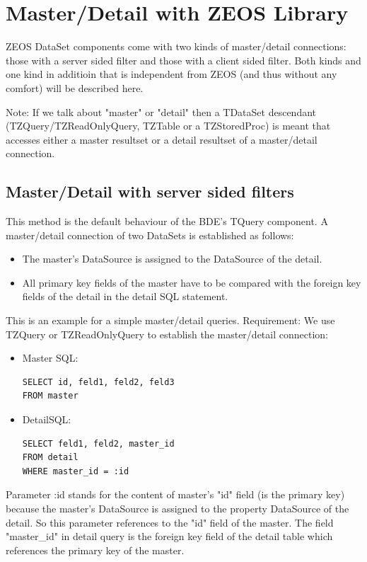\documentclass[a4paper,12pt,oneside]{book}
\begin{document}
\section{Master/Detail with ZEOS Library}
ZEOS DataSet components come with two kinds of master/detail connections:
those with a server sided filter and those with a client sided filter.
Both kinds and one kind in additioin that is independent from ZEOS (and thus without any comfort) will be described here.

Note: If we talk about "master" or "detail" then a TDataSet descendant (TZQuery/TZReadOnlyQuery, TZTable or a TZStoredProc) is meant that accesses either a master resultset or a detail resultset of a master/detail connection.

\subsection{Master/Detail with server sided filters}
This method is the default behaviour of the BDE's TQuery component.
A master/detail connection of two DataSets is established as follows:

\begin{itemize}
  \item The master's DataSource is assigned to the DataSource of the detail.
	\item All primary key fields of the master have to be compared with the foreign key fields of the detail in the detail SQL statement.
\end{itemize}

This is an example for a simple master/detail queries. Requirement: We use TZQuery or TZReadOnlyQuery to establish the master/detail connection:

\begin{itemize}
\item Master SQL:
\begin{verbatim}
SELECT id, feld1, feld2, feld3
FROM master
\end{verbatim}

\item DetailSQL:
\begin{verbatim}
SELECT feld1, feld2, master_id
FROM detail
WHERE master_id = :id
\end{verbatim}
\end{itemize}

Parameter :id stands for the content of master's "id" field (is the primary key) because the master's DataSource is assigned to the property DataSource of the detail.
So this parameter references to the "id" field of the master.
The field "master\_id" in detail query is the foreign key field of the detail table which references the primary key of the master.
\end{document}
